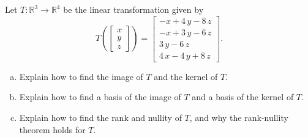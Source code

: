 
\begin{exerciseStatement}
 Let \(T:\mathbb{R}^ 3  \to \mathbb{R}^ 4 \) be the linear transformation given by \[T\left(  \left[\begin{array}{c}
x \\
y \\
z
\end{array}\right]  \right) =  \left[\begin{array}{c}
-x + 4 \, y - 8 \, z \\
-x + 3 \, y - 6 \, z \\
3 \, y - 6 \, z \\
4 \, x - 4 \, y + 8 \, z
\end{array}\right] .\]
\begin{enumerate}[(a)]
\item Explain how to find the image of \(T\) and the kernel of \(T\).
\item Explain how to find a basis of the image of \(T\) and a basis of the kernel of \(T\).
\item Explain how to find the rank and nullity of \(T\), and why the rank-nullity theorem holds for \(T\).
\end{enumerate}
    
\end{exerciseStatement}
    
